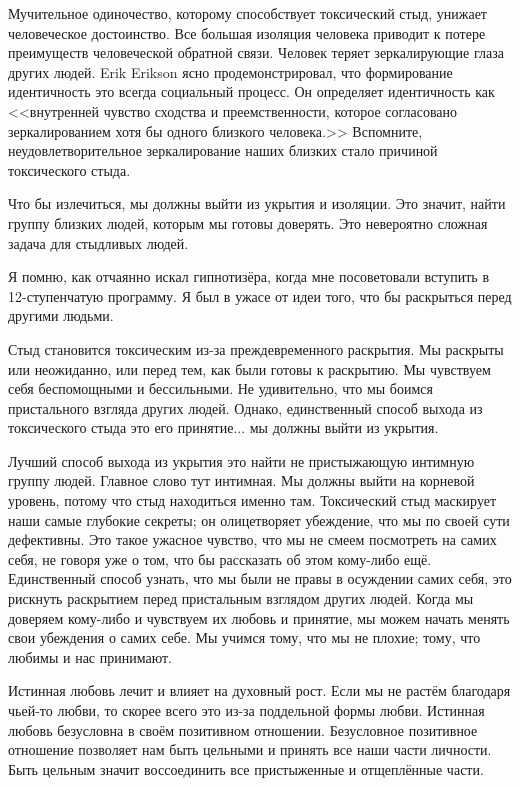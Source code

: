 \documentclass[10pt, fleqn]{article}
\begin{document}

Мучительное одиночество, которому способствует токсический стыд, унижает человеческое достоинство. Все большая изоляция человека приводит к потере преимуществ человеческой обратной связи. Человек теряет зеркалирующие глаза других людей. Erik Erikson ясно продемонстрировал, что формирование идентичность это всегда социальный процесс. Он определяет идентичность как <<внутренней чувство сходства и преемственности, которое согласовано зеркалированием хотя бы одного близкого человека.>> Вспомните, неудовлетворительное зеркалирование наших близких стало причиной токсического стыда.

Что бы излечиться, мы должны выйти из укрытия и изоляции. Это значит, найти группу близких людей, которым мы готовы доверять. Это невероятно сложная задача для стыдливых людей.

Я помню, как отчаянно искал гипнотизёра, когда мне посоветовали вступить в 12-ступенчатую программу. Я был в ужасе от идеи того, что бы раскрыться перед другими людьми.

Стыд становится токсическим из-за преждевременного раскрытия. Мы раскрыты или неожиданно, или перед тем, как были готовы к раскрытию. Мы чувствуем себя беспомощными и бессильными. Не удивительно, что мы боимся пристального взгляда других людей. Однако, единственный способ выхода из токсического стыда это его принятие... мы должны выйти из укрытия.


Лучший способ выхода из укрытия это найти не пристыжающую интимную группу людей. Главное слово тут интимная. Мы должны выйти на корневой уровень, потому что стыд находиться именно там. Токсический стыд маскирует наши самые глубокие секреты; он олицетворяет убеждение, что мы по своей сути дефективны. Это такое ужасное чувство, что мы не смеем посмотреть на самих себя, не говоря уже о том, что бы рассказать об этом кому-либо ещё. Единственный способ узнать, что мы были не правы в осуждении самих себя, это рискнуть раскрытием перед пристальным взглядом других людей. Когда мы доверяем кому-либо и чувствуем их любовь и принятие, мы можем начать менять свои убеждения о самих себе. Мы учимся тому, что мы не плохие; тому, что любимы и нас принимают.

Истинная любовь лечит и влияет на духовный рост. Если мы не растём благодаря чьей-то любви, то скорее всего это из-за поддельной формы любви. Истинная любовь безусловна в своём позитивном отношении. Безусловное позитивное отношение позволяет нам быть цельными и принять все наши части личности. Быть цельным значит воссоединить все пристыженные и отщеплённые части.
\end{document}
